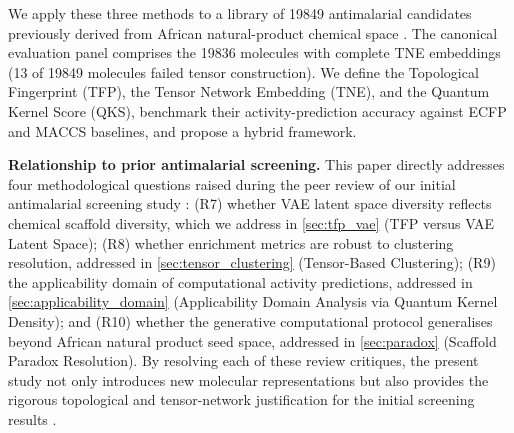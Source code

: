 \documentclass[11pt,a4paper]{article}
\begin{document}
We apply these three methods to a library of \num{19849} antimalarial candidates previously derived from African natural-product chemical space \citep{temgoua2026antimalarial}. The canonical evaluation panel comprises the \num{19836} molecules with complete TNE embeddings (13 of \num{19849} molecules failed tensor construction). We define the Topological Fingerprint (TFP), the Tensor Network Embedding (TNE), and the Quantum Kernel Score (QKS), benchmark their activity-prediction accuracy against ECFP and MACCS baselines, and propose a hybrid framework.

\noindent\textbf{Relationship to prior antimalarial screening.} This paper directly addresses four methodological questions raised during the peer review of our initial antimalarial screening study \citep{temgoua2026antimalarial}: (R7) whether VAE latent space diversity reflects chemical scaffold diversity, which we address in \cref{sec:tfp_vae} (TFP versus VAE Latent Space); (R8) whether enrichment metrics are robust to clustering resolution, addressed in \cref{sec:tensor_clustering} (Tensor-Based Clustering); (R9) the applicability domain of computational activity predictions, addressed in \cref{sec:applicability_domain} (Applicability Domain Analysis via Quantum Kernel Density); and (R10) whether the generative computational protocol generalises beyond African natural product seed space, addressed in \cref{sec:paradox} (Scaffold Paradox Resolution). By resolving each of these review critiques, the present study not only introduces new molecular representations but also provides the rigorous topological and tensor-network justification for the initial screening results \citep{temgoua2026antimalarial}.
\end{document}
